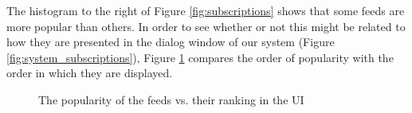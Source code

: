 The histogram to the right of Figure \ref{fig:subscriptions} shows that some feeds are more popular than others. 
% 
In order to see whether or not this might be related to how they are presented in the dialog window of our system (Figure \ref{fig:system_subscriptions}), Figure \ref{fig:popularityvsranking} compares the order of popularity with the order in which they are displayed. 


\begin{figure}[h!]
\centering
  
  \caption{The popularity of the feeds vs. their ranking in the UI}
  \label{fig:popularityvsranking}
\end{figure}



